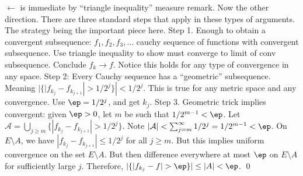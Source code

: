 \pfsk $\leftarrow$ is immediate by ``triangle inequality'' measure remark. Now the other direction. There are three standard steps that apply in these types of arguments. The strategy being the important piece here. Step 1. Enough to obtain a convergent subsequence: $f_1,f_2,f_3,\ldots$ cauchy sequence of functions with convergent subsequence. Use triangle inequality to show must converge to limit of conv subsequence. Conclude $f_k \to f$. Notice this holds for any type of convergence in any space. Step 2: Every Cauchy sequence has a ``geometric'' subsequence. Meaning $|\{ |f_{k_j} - f_{k_{j+1}}|>1/2^j\}|<1/2^j$. This is true for any metric space and any convergence. Use $\ep=1/2^j$, and get $k_j$. Step 3. Geometric trick implies convergent: given $\ep>0$, let $m$ be such that $1/2^{m-1}<\ep$. Let $\mathcal{A}= \bigcup_{j \geq m} \{ |f_{k_j} - f_{k_{j+1}}|>1/2^j\}$. Note $|\mathcal{A}|< \sum_{j=m}^\infty 1/2^j = 1/2^{m-1}<\ep$. On $E \setminus A$, we have $|f_{k_j} - f_{k_{j+1}}| \leq 1/2^j$ for all $j \geq m$. But this implies uniform convergence on the set $E \setminus A$. But then difference everywhere at most $\ep$ on $E \setminus A$ for sufficiently large $j$. Therefore, $|\{ |f_{k_j} - f|>\ep\}| \leq |A|<\ep$. \qed \\ 






















